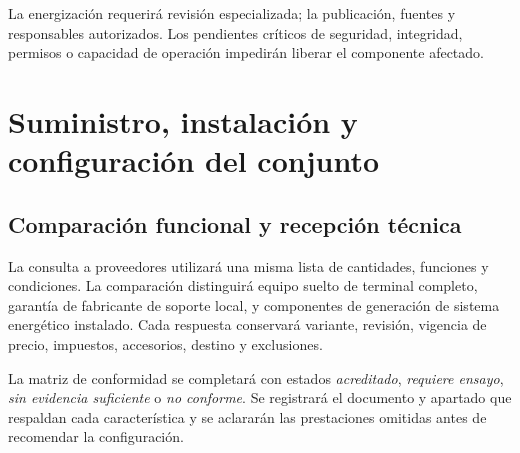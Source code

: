 
La energización requerirá revisión especializada; la publicación, fuentes y responsables autorizados. Los pendientes críticos de seguridad, integridad, permisos o capacidad de operación impedirán liberar el componente afectado.

\section{Suministro, instalación y configuración del conjunto}
\label{sec:int_instalacion}
\subsection{Comparación funcional y recepción técnica}
La consulta a proveedores utilizará una misma lista de cantidades, funciones y condiciones. La comparación distinguirá equipo suelto de terminal completo, garantía de fabricante de soporte local, y componentes de generación de sistema energético instalado. Cada respuesta conservará variante, revisión, vigencia de precio, impuestos, accesorios, destino y exclusiones.

La matriz de conformidad se completará con estados \emph{acreditado}, \emph{requiere ensayo}, \emph{sin evidencia suficiente} o \emph{no conforme}. Se registrará el documento y apartado que respaldan cada característica y se aclararán las prestaciones omitidas antes de recomendar la configuración.

